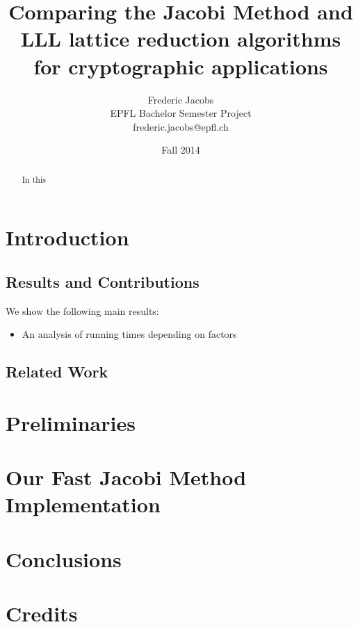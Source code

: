 \documentclass[12pt]{article}
\title{Comparing the Jacobi Method and LLL lattice reduction algorithms for cryptographic applications}
\date{Fall 2014}
\author{Frederic Jacobs\\ EPFL Bachelor Semester Project\\ frederic.jacobs@epfl.ch}
\begin{document}
\maketitle

\begin{abstract}
In this \cite{originalJacobiMethodLatticeBasisReduction}
\end{abstract}

\section{Introduction}


\subsection{Results and Contributions}

We show the following main results:
\begin{itemize}
\item An analysis of running times depending on factors
\end{itemize}


\subsection{Related Work}

\section{Preliminaries}


\section{Our Fast Jacobi Method Implementation}

\section{Conclusions}




\section{Credits}
\end{document}
